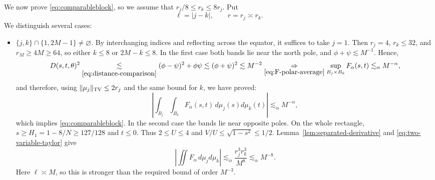\documentclass[11pt]{amsart}
\begin{document}
We now prove \eqref{eq:comparableblock}, so we assume that $r_j/8\leq r_k\leq 8r_j$. Put
\[
 \ell=|j-k|,
 \qquad
 r=r_j\asymp r_k.
\]
\noindent We distinguish several cases:
\begin{itemize}
    \item $\{j,k\}\cap\{1,2M-1\}\ne\varnothing$. By interchanging indices and reflecting across the equator, it suffices to take $j=1$. Then $r_j=4$, $r_k\le32$, and $r_M\ge4M\ge64$, so either $k\le8$ or $2M-k\le8$.
In the first case both bands lie near the north pole, and
$\phi+\psi\lesssim M^{-1}$.
Hence,
\[
D(s,t,\theta)^2\underset{\eqref{eq:distance-comparison}}\lesssim (\phi-\psi)^2+\phi\psi\lesssim (\phi+\psi)^2\lesssim M^{-2}
\underset{\eqref{eq:F-polar-average}}{\Rightarrow}\sup_{B_j\times B_k}F_\alpha(s,t)\lesssim_\alpha M^{-\alpha},
\]
and therefore, using \(\|\mu_j\|_{\rm TV}\le 2r_j\) and the same bound for $k$, we have proved:
\[
\left|
\int_{B_j}\int_{B_k}
F_\alpha(s,t)\,d\mu_j(s)d\mu_k(t)
\right|
\lesssim_\alpha M^{-\alpha},
\]
which implies \eqref{eq:comparableblock}.
In the second case the bands lie near opposite poles. On the whole rectangle,
$s\ge H_1=1-8/N\ge127/128$ and $t\le0$. Thus $2\le U\le4$ and
$V/U\le\sqrt{1-s^2}\le1/2$.
Lemma~\ref{lem:separated-derivative} and \eqref{eq:two-variable-taylor} give
\[
 \left|\iint F_\alpha\,d\mu_jd\mu_k\right|
 \lesssim_\alpha \frac{r_j^3r_k^3}{M^8}
 \lesssim_\alpha M^{-8}.
\]
Here $\ell\asymp M$, so this is stronger than the required bound of order $M^{-3}$.






\end{itemize}
\end{document}
